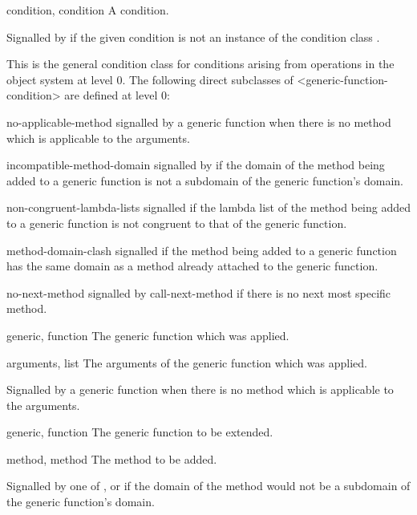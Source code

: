 \begin{optDefinition}
%
\begin{initoptions}
    \item[condition, condition] A condition.
\end{initoptions}
%
Signalled by  if the given condition is not an instance of
the condition class .

%
This is the general condition class for conditions arising from operations in
the object system at level 0. The following direct subclasses of
<generic-function-condition> are defined at level 0:
%
\begin{subclasses}
    \item[no-applicable-method] signalled by a generic function when there is
    no method which is applicable to the arguments.
    \item[incompatible-method-domain] signalled by if the domain of the method
    being added to a generic function is not a subdomain of the generic
    function's domain.
    \item[non-congruent-lambda-lists] signalled if the lambda list of the
    method being added to a generic function is not congruent to that of the
    generic function.
    \item[method-domain-clash] signalled if the method being added to a
    generic function has the same domain as a method already attached to the
    generic function.
    \item[no-next-method] signalled by call-next-method if there is no next
    most specific method.
\end{subclasses}
%
%
\begin{initoptions}
    \item[generic, function] The generic function which was applied.
    \item[arguments, list] The arguments of the generic function which was
    applied.
\end{initoptions}
%
\remarks%
Signalled by a generic function when there is no method which is applicable to
the arguments.

%
\begin{initoptions}
    \item[generic, function] The generic function to be extended.
    \item[method, method] The method to be added.
\end{initoptions}
%
\remarks%
Signalled by one of ,  or
 if the domain of the method would not be a subdomain
of the generic function's domain.


\end{optDefinition}
